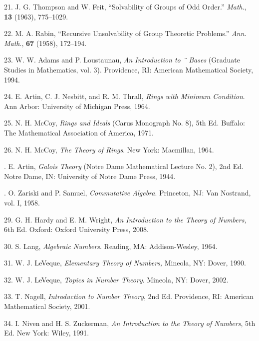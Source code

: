 \documentclass[11pt,oneside]{article}
\begin{document}
\begin{BookBody}

21. J. G. Thompson and W. Feit, “Solvability of Groups of Odd Order.”  \textit{Math}.,\textbf{ 13} (1963), 775–1029.

22. M. A. Rabin, “Recursive Unsolvability of Group Theoretic Problems.”\textit{ Ann. Math}.,\textbf{ 67} (1958), 172–194.


23. W. W. Adams and P. Loustaunau,\textit{ An Introduction to} \textit{¨} \textit{Bases} (Graduate Studies in Mathematics, vol. 3). Providence, RI: American Mathematical Society, 1994.

24. E. Artin, C. J. Nesbitt, and R. M. Thrall,\textit{ Rings with Minimum Condition}. Ann Arbor: University of Michigan Press, 1964.

25. N. H. McCoy,\textit{ Rings and Ideals} (Carus Monograph No. 8), 5th Ed. Buffalo: The Mathematical Association of America, 1971.

26. N. H. McCoy,\textit{ The Theory of Rings}. New York: Macmillan, 1964.


. E. Artin,\textit{ Galois Theory} (Notre Dame Mathematical Lecture No. 2), 2nd Ed. Notre Dame, IN: University of Notre Dame Press, 1944.

. O. Zariski and P. Samuel,\textit{ Commutative Algebra}. Princeton, NJ: Van Nostrand, vol. I, 1958.


29. G. H. Hardy and E. M. Wright,\textit{ An Introduction to the Theory of Numbers,} 6th Ed. Oxford: Oxford University Press, 2008.

30. S. Lang,\textit{ Algebraic Numbers}. Reading, MA: Addison-Wesley, 1964.

31. W. J. LeVeque,\textit{ Elementary Theory of Numbers,} Mineola, NY: Dover, 1990.

32. W. J. LeVeque,\textit{ Topics in Number Theory}. Mineola, NY: Dover, 2002.

33. T. Nagell,\textit{ Introduction to Number Theory}, 2nd Ed. Providence, RI: American Mathematical Society, 2001.

34. I. Niven and H. S. Zuckerman,\textit{ An Introduction to the Theory of Numbers}, 5th Ed. New York: Wiley, 1991.


\end{BookBody}
\end{document}
